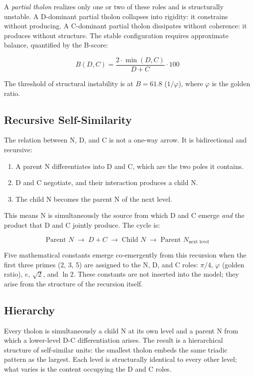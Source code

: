 \documentclass[12pt]{article}
\providecommand{\tightlist}{%
  \setlength{\itemsep}{0pt}\setlength{\parskip}{0pt}}
\begin{document}
A \emph{partial tholon} realizes only one or two of these roles and is
structurally unstable. A D-dominant partial tholon collapses into
rigidity: it constrains without producing. A C-dominant partial tholon
dissipates without coherence: it produces without structure. The stable
configuration requires approximate balance, quantified by the B-score:

\[B(D,C) = \frac{2 \cdot \min(D,C)}{D + C} \cdot 100\]

The threshold of structural instability is at \(B = 61.8\)
(\(1/\varphi\)), where \(\varphi\) is the golden ratio.

\subsection{Recursive Self-Similarity}\label{recursive-self-similarity}

The relation between N, D, and C is not a one-way arrow. It is
bidirectional and recursive:

\begin{enumerate}
\def\labelenumi{\arabic{enumi}.}
\tightlist
\item
  A parent N differentiates into D and C, which are the two poles it
  contains.
\item
  D and C negotiate, and their interaction produces a child N.
\item
  The child N becomes the parent N of the next level.
\end{enumerate}

This means N is simultaneously the source from which D and C emerge
\emph{and} the product that D and C jointly produce. The cycle is:

\[\text{Parent } N \;\to\; D + C \;\to\; \text{Child } N \;\to\; \text{Parent } N_{\text{next level}}\]

Five mathematical constants emerge co-emergently from this recursion
when the first three primes (2, 3, 5) are assigned to the N, D, and C
roles: \(\pi/4\), \(\varphi\) (golden ratio), \(e\), \(\sqrt{2}\), and
\(\ln 2\). These constants are not inserted into the model; they arise
from the structure of the recursion itself.

\subsection{Hierarchy}\label{hierarchy}

Every tholon is simultaneously a child N at its own level and a parent N
from which a lower-level D-C differentiation arises. The result is a
hierarchical structure of self-similar units: the smallest tholon embeds
the same triadic pattern as the largest. Each level is structurally
identical to every other level; what varies is the content occupying the
D and C roles.
\end{document}
